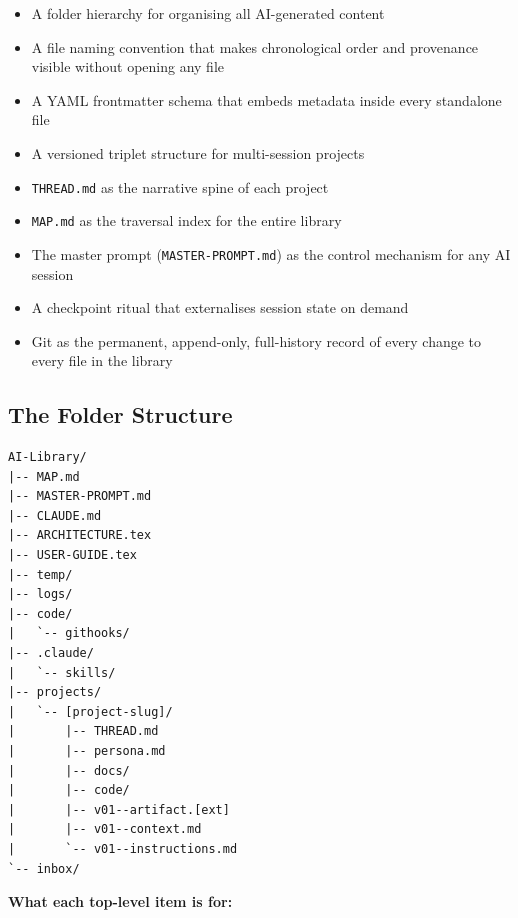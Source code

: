 \documentclass[12pt,letterpaper]{article}
\begin{document}
\begin{itemize}
  \item A folder hierarchy for organising all AI-generated content
  \item A file naming convention that makes chronological order and
        provenance visible without opening any file
  \item A YAML frontmatter schema that embeds metadata inside every
        standalone file
  \item A versioned triplet structure for multi-session projects
  \item \texttt{THREAD.md} as the narrative spine of each project
  \item \texttt{MAP.md} as the traversal index for the entire library
  \item The master prompt (\texttt{MASTER-PROMPT.md}) as the control
        mechanism for any AI session
  \item A checkpoint ritual that externalises session state on demand
  \item Git as the permanent, append-only, full-history record of every
        change to every file in the library
\end{itemize}

\subsection{The Folder Structure}

\begin{lstlisting}
AI-Library/
|-- MAP.md
|-- MASTER-PROMPT.md
|-- CLAUDE.md
|-- ARCHITECTURE.tex
|-- USER-GUIDE.tex
|-- temp/
|-- logs/
|-- code/
|   `-- githooks/
|-- .claude/
|   `-- skills/
|-- projects/
|   `-- [project-slug]/
|       |-- THREAD.md
|       |-- persona.md
|       |-- docs/
|       |-- code/
|       |-- v01--artifact.[ext]
|       |-- v01--context.md
|       `-- v01--instructions.md
`-- inbox/
\end{lstlisting}

\textbf{What each top-level item is for:}
\end{document}
